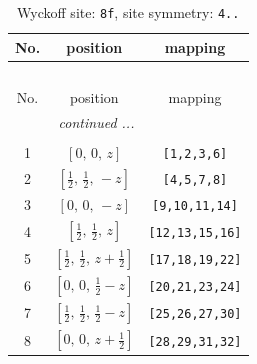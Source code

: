 \documentclass[fleqn,8pt]{jsarticle}
\begin{document}
\begin{longtable}{ccc}
\caption{Wyckoff site: {\tt 8f}, site symmetry: {\tt 4..}}
 \\
 \hline \hline
No. & position & mapping \\ \hline \endfirsthead

\multicolumn{2}{l}{\tablename\ \thetable{}} \\
 \hline \hline
No. & position & mapping \\ \hline \endhead

 \hline \hline
\multicolumn{2}{r}{\footnotesize\it continued ...} \\ \endfoot

 \hline \hline
\multicolumn{2}{r}{} \\ \endlastfoot

1 & $\left[ 0,\, 0,\, z \right]$ & {\tt [1,2,3,6]} \\ \hline
2 & $\left[ \frac{1}{2},\, \frac{1}{2},\, - z \right]$ & {\tt [4,5,7,8]} \\ \hline
3 & $\left[ 0,\, 0,\, - z \right]$ & {\tt [9,10,11,14]} \\ \hline
4 & $\left[ \frac{1}{2},\, \frac{1}{2},\, z \right]$ & {\tt [12,13,15,16]} \\ \hline
5 & $\left[ \frac{1}{2},\, \frac{1}{2},\, z + \frac{1}{2} \right]$ & {\tt [17,18,19,22]} \\ \hline
6 & $\left[ 0,\, 0,\, \frac{1}{2} - z \right]$ & {\tt [20,21,23,24]} \\ \hline
7 & $\left[ \frac{1}{2},\, \frac{1}{2},\, \frac{1}{2} - z \right]$ & {\tt [25,26,27,30]} \\ \hline
8 & $\left[ 0,\, 0,\, z + \frac{1}{2} \right]$ & {\tt [28,29,31,32]} \\
\end{longtable}
\renewcommand{\arraystretch}{1.2}
\end{document}
